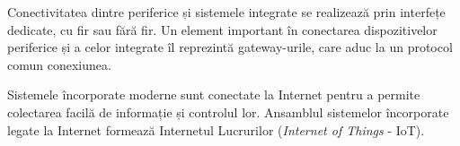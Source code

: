 Conectivitatea dintre periferice și sistemele integrate se realizează prin interfețe dedicate, cu fir sau fără fir.
Un element important în conectarea dispozitivelor periferice și a celor integrate îl reprezintă gateway-urile, care aduc la un protocol comun conexiunea.

Sistemele încorporate moderne sunt conectate la Internet pentru a permite colectarea facilă de informație și controlul lor.
Ansamblul sistemelor încorporate legate la Internet formează Internetul Lucrurilor (\textit{Internet of Things} - IoT).
